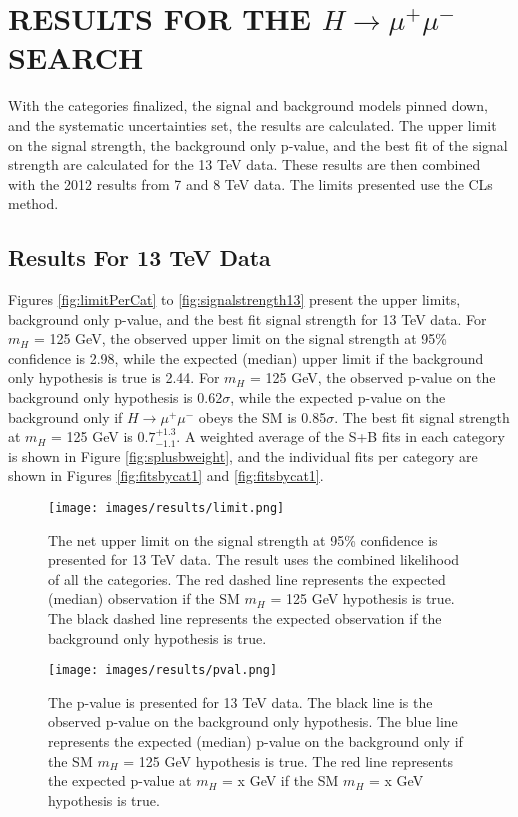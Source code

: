 \chapter{RESULTS FOR THE $H\rightarrow\mu^+\mu^-$ SEARCH} \label{results}

With the categories finalized, the signal and background models pinned down, and the systematic uncertainties set, the results are calculated. The upper limit on the signal strength, the background only p-value, and the best fit of the signal strength are calculated for the 13 TeV data. These results are then combined with the 2012 results from 7 and 8 TeV data. The limits presented use the CLs method.  
\section{Results For 13 TeV Data}
Figures \ref{fig:limitPerCat} to \ref{fig:signalstrength13} present the upper limits, background only p-value, and the best fit signal strength for 13 TeV data. For $m_H$ = 125 GeV, the observed upper limit on the signal strength at 95\% confidence is 2.98, while the expected (median) upper limit if the background only hypothesis is true is 2.44. For $m_H$ = 125 GeV, the observed p-value on the background only hypothesis is 0.62$\sigma$, while the expected p-value on the background only if $H\rightarrow\mu^+\mu^-$ obeys the SM is 0.85$\sigma$. The best fit signal strength at $m_H$ = 125 GeV is $0.7^{+1.3}_{-1.1}$. A weighted average of the S+B fits in each category is shown in Figure \ref{fig:splusbweight}, and the individual fits per category are shown in Figures \ref{fig:fitsbycat1} and \ref{fig:fitsbycat1}. 
\begin{figure}[h!]
    \centering
    \texttt{[image: images/results/limit.png]}
    \caption[The net upper limit on the signal strength for 13 TeV data alone.]
    {The net upper limit on the signal strength at 95\% confidence is presented for 13 TeV data. The result uses the combined likelihood of all the categories. The red dashed line represents the expected (median) observation if the SM $m_H$ = 125 GeV hypothesis is true. The black dashed line represents the expected observation if the background only hypothesis is true.}
    \label{fig:limit13}
\end{figure}
\begin{figure}[h!]
    \centering
    \texttt{[image: images/results/pval.png]}
    \caption[The p-value on the background-only hypothesis using 13 TeV data alone.]
    {The p-value is presented for 13 TeV data. The black line is the observed p-value on the background only hypothesis. The blue line represents the expected (median) p-value on the background only if the SM $m_H$ = 125 GeV hypothesis is true. The red line represents the expected p-value at $m_H$ = x GeV if the SM $m_H$ = x GeV hypothesis is true.}
    \label{fig:pval13}
\end{figure}
